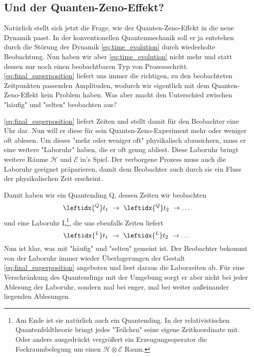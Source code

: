 \documentclass[12pt]{article}
\begin{document}
\subsection{Und der Quanten-Zeno-Effekt?}

Natürlich stellt sich jetzt die Frage, wie der Quanten-Zeno-Effekt in die neue Dynamik passt. In der konventionellen Quantenmechanik soll er ja entstehen durch die Störung der Dynamik \eqref{eq:time_evolution} durch wiederholte Beobachtung. Nun haben wir aber \eqref{eq:time_evolution} nicht mehr und statt dessen nur noch einen beobachtbaren Typ von Prozessschritt. \eqref{eq:final_superposition} liefert uns immer die richtigen, zu den beobachteten Zeitpunkten passenden Amplituden, wodurch wir eigentlich mit dem Quanten-Zeno-Effekt kein Problem haben. Was aber macht den Unterschied zwischen "häufig" und "selten" beobachten aus?

\eqref{eq:final_superposition} liefert Zeiten und stellt damit für den Beobachter eine Uhr dar. Nun will er diese für sein Quanten-Zeno-Experiment mehr oder weniger oft ablesen. Um dieses "mehr oder weniger oft" physikalisch abzusichern, muss er eine weitere "Laboruhr" haben, die er oft genug abliest. Diese Laboruhr bringt weitere Räume $\mathscr{H}$ und $\mathscr{E}$ in's Spiel. Der verborgene Prozess muss auch die Laboruhr geeignet präparieren, damit dem Beobachter auch durch sie ein Fluss der physikalischen Zeit erscheint.

Damit haben wir ein Quantending Q, dessen Zeiten wir beobachten
\begin{equation*}
\leftidx{^Q}t_1\ \rightarrow\ \leftidx{^Q}t_2\ \rightarrow \dots
\end{equation*}
und eine Laboruhr L\footnote{Am Ende ist sie natürlich auch ein Quantending. In der relativistischen Quantenfeldtheorie bringt jedes "Teilchen" seine eigene Zeitkoordinate mit. Oder anders ausgedrückt vergrößert ein Erzeugungsoperator die Fockraumbelegung um einen $\mathscr{H} \otimes \mathscr{E}$ Raum.}, die uns ebenfalls Zeiten liefert
\begin{equation*}
\leftidx{^L}t_1\ \rightarrow\ \leftidx{^L}t_2 \ \rightarrow \dots
\end{equation*}
Nun ist klar, was mit "häufig" und "selten" gemeint ist. Der Beobachter bekommt von der Laboruhr immer wieder Überlagerungen der Gestalt \eqref{eq:final_superposition} angeboten und liest daraus die Laborzeiten ab. Für eine Verschränkung des Quantendings mit der Umgebung sorgt er aber nicht bei jeder Ablesung der Laboruhr, sondern mal bei enger, mal bei weiter außeinander liegenden Ablesungen. 
\end{document}
